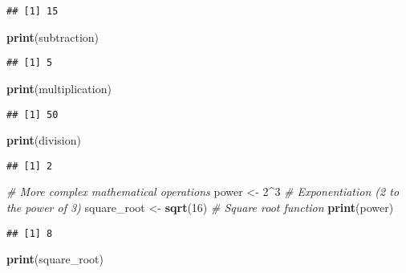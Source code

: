 \documentclass[
]{book}
\newenvironment{Shaded}{\begin{snugshade}}{\end{snugshade}}
\newcommand{\CommentTok}[1]{\textcolor[rgb]{0.56,0.35,0.01}{\textit{#1}}}
\newcommand{\DecValTok}[1]{\textcolor[rgb]{0.00,0.00,0.81}{#1}}
\newcommand{\FunctionTok}[1]{\textcolor[rgb]{0.13,0.29,0.53}{\textbf{#1}}}
\newcommand{\NormalTok}[1]{#1}
\newcommand{\OtherTok}[1]{\textcolor[rgb]{0.56,0.35,0.01}{#1}}
\newcommand{\SpecialCharTok}[1]{\textcolor[rgb]{0.81,0.36,0.00}{\textbf{#1}}}
\begin{document}
\begin{verbatim}
## [1] 15
\end{verbatim}

\begin{Shaded}
\begin{Highlighting}[]
\FunctionTok{print}\NormalTok{(subtraction)}
\end{Highlighting}
\end{Shaded}

\begin{verbatim}
## [1] 5
\end{verbatim}

\begin{Shaded}
\begin{Highlighting}[]
\FunctionTok{print}\NormalTok{(multiplication)}
\end{Highlighting}
\end{Shaded}

\begin{verbatim}
## [1] 50
\end{verbatim}

\begin{Shaded}
\begin{Highlighting}[]
\FunctionTok{print}\NormalTok{(division)}
\end{Highlighting}
\end{Shaded}

\begin{verbatim}
## [1] 2
\end{verbatim}

\begin{Shaded}
\begin{Highlighting}[]
\CommentTok{\# More complex mathematical operations}
\NormalTok{power }\OtherTok{\textless{}{-}} \DecValTok{2}\SpecialCharTok{\^{}}\DecValTok{3}            \CommentTok{\# Exponentiation (2 to the power of 3)}
\NormalTok{square\_root }\OtherTok{\textless{}{-}} \FunctionTok{sqrt}\NormalTok{(}\DecValTok{16}\NormalTok{) }\CommentTok{\# Square root function}
\FunctionTok{print}\NormalTok{(power)}
\end{Highlighting}
\end{Shaded}

\begin{verbatim}
## [1] 8
\end{verbatim}

\begin{Shaded}
\begin{Highlighting}[]
\FunctionTok{print}\NormalTok{(square\_root)}
\end{Highlighting}
\end{Shaded}
\end{document}
